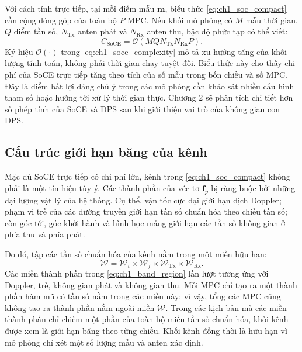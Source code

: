 Với cách tính trực tiếp, tại mỗi điểm mẫu \(\mathbf{m}\), biểu thức \eqref{eq:ch1_soc_compact} cần cộng đóng góp của toàn bộ \(P\) MPC. Nếu khối mô phỏng có \(M\) mẫu thời gian, \(Q\) điểm tần số, \(N_{\mathrm{Tx}}\) anten phát và \(N_{\mathrm{Rx}}\) anten thu, bậc độ phức tạp có thể viết:
\begin{equation}
C_{\mathrm{SoCE}}
= \mathcal{O}\!\left(MQN_{\mathrm{Tx}}N_{\mathrm{Rx}}P\right).
\label{eq:ch1_soce_complexity}
\end{equation}
Ký hiệu \(\mathcal{O}(\cdot)\) trong \eqref{eq:ch1_soce_complexity} mô tả xu hướng tăng của khối lượng tính toán, không phải thời gian chạy tuyệt đối. Biểu thức này cho thấy chi phí của SoCE trực tiếp tăng theo tích của số mẫu trong bốn chiều và số MPC. Đây là điểm bất lợi đáng chú ý trong các mô phỏng cần khảo sát nhiều cấu hình tham số hoặc hướng tới xử lý thời gian thực. Chương 2 sẽ phân tích chi tiết hơn số phép tính của SoCE và DPS sau khi giới thiệu vai trò của không gian con DPS.

\subsection{Cấu trúc giới hạn băng của kênh}
\label{subsec:ch1_bandlimited}

Mặc dù SoCE trực tiếp có chi phí lớn, kênh trong \eqref{eq:ch1_soc_compact} không phải là một tín hiệu tùy ý. Các thành phần của véc-tơ \(\mathbf{f}_p\) bị ràng buộc bởi những đại lượng vật lý của hệ thống. Cụ thể, vận tốc cực đại giới hạn dịch Doppler; phạm vi trễ của các đường truyền giới hạn tần số chuẩn hóa theo chiều tần số; còn góc tới, góc khởi hành và hình học mảng giới hạn các tần số không gian ở phía thu và phía phát.

Do đó, tập các tần số chuẩn hóa của kênh nằm trong một miền hữu hạn:
\begin{equation}
\mathcal{W}
= \mathcal{W}_t \times \mathcal{W}_f
\times \mathcal{W}_{\mathrm{Tx}}
\times \mathcal{W}_{\mathrm{Rx}}.
\label{eq:ch1_band_region}
\end{equation}
Các miền thành phần trong \eqref{eq:ch1_band_region} lần lượt tương ứng với Doppler, trễ, không gian phát và không gian thu. Mỗi MPC chỉ tạo ra một thành phần hàm mũ có tần số nằm trong các miền này; vì vậy, tổng các MPC cũng không tạo ra thành phần nằm ngoài miền \(\mathcal{W}\). Trong các kịch bản mà các miền thành phần chỉ chiếm một phần của toàn bộ miền tần số chuẩn hóa, khối kênh được xem là giới hạn băng theo từng chiều. Khối kênh đồng thời là hữu hạn vì mô phỏng chỉ xét một số lượng mẫu và anten xác định.

